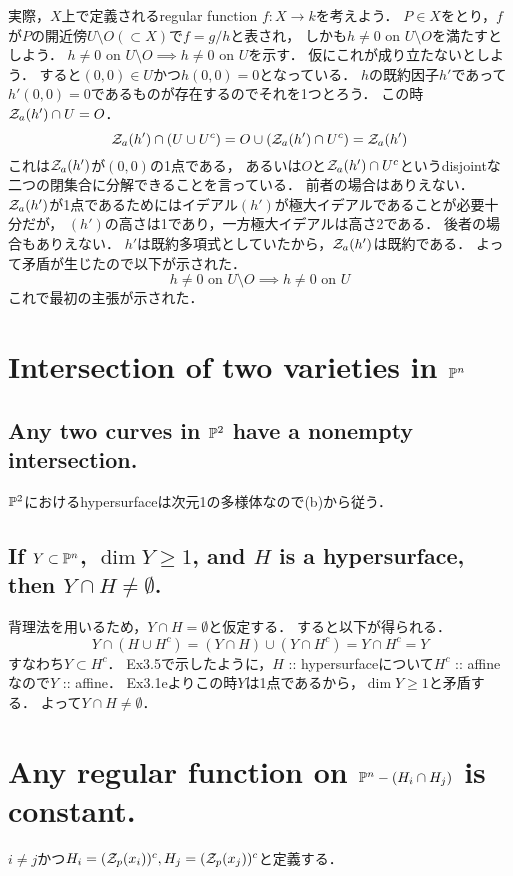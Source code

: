 \documentclass[a4paper]{jsarticle}
\begin{document}
    実際，$ X$上で定義されるregular function $f:X \to k$を考えよう．
    $P \in X$をとり，$f$が$P$の開近傍$U \setminus O (\subset X)$で$f=g/h$と表され，
    しかも$h \neq 0 \mbox{ on } U \setminus O$を満たすとしよう．
    $h \neq 0 \mbox{ on } U \setminus O \implies h \neq 0 \mbox{ on } U$を示す．
    仮にこれが成り立たないとしよう．
    すると$(0,0) \in U$かつ$h(0,0)=0$となっている．
    $h$の既約因子$h'$であって$h'(0,0)=0$であるものが存在するのでそれを1つとろう．
    この時$\mathcal{Z}_a(h') \cap U=O$．
    \[ \mathcal{Z}_a(h') \cap (U \cup U^c)=O \cup (\mathcal{Z}_a(h') \cap U^c)=\mathcal{Z}_a(h') \]
    これは$\mathcal{Z}_a(h')$が$(0,0)$の1点である，
    あるいは$O$と$\mathcal{Z}_a(h') \cap U^c$というdisjointな二つの閉集合に分解できることを言っている．
    前者の場合はありえない．
    $\mathcal{Z}_a(h')$が1点であるためにはイデアル$(h')$が極大イデアルであることが必要十分だが，
    $(h')$の高さは1であり，一方極大イデアルは高さ2である．
    後者の場合もありえない．
    $h'$は既約多項式としていたから，$\mathcal{Z}_a(h')$は既約である．
    よって矛盾が生じたので以下が示された．
    \[ h \neq 0 \mbox{ on } U \setminus O \implies h \neq 0 \mbox{ on } U \]
    これで最初の主張が示された．

\section{Intersection of two varieties in $\mathbb{P}^n$} 
    \subsection{Any two curves in $\mathbb{P}^2$ have a nonempty intersection.}
    $\mathbb{P}^2$におけるhypersurfaceは次元1の多様体なので(b)から従う．

    \subsection{If $Y \subset \mathbb{P}^n$, $\dim Y \geq 1$, and $H$ is a hypersurface, then $Y \cap H \neq \emptyset$.}
    背理法を用いるため，$Y \cap H=\emptyset$と仮定する．
    すると以下が得られる．
    \[ Y \cap (H \cup H^c)=(Y \cap H) \cup (Y \cap H^c)=Y \cap H^c=Y \]
    すなわち$Y \subset H^c$．
    Ex3.5で示したように，$H$ :: hypersurfaceについて$H^c$ :: affineなので$Y$ :: affine．
    Ex3.1eよりこの時$Y$は1点であるから，$\dim Y \geq 1$と矛盾する．
    よって$Y \cap H \neq \emptyset$．

\section{Any regular function on $\mathbb{P}^n - (H_i \cap H_j)$ is constant.} 
    $i \neq j$かつ$H_i=(\mathcal{Z}_p(x_i))^c, H_j=(\mathcal{Z}_p(x_j))^c$と定義する．
\end{document}
